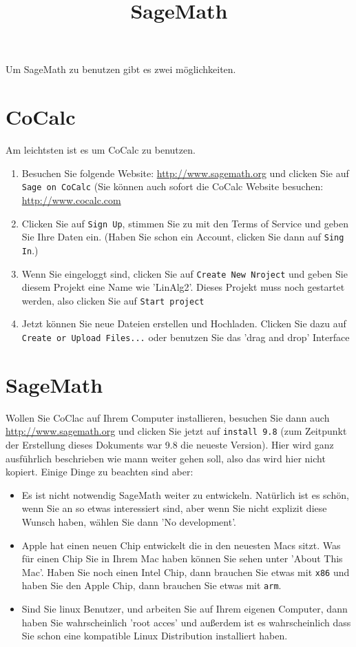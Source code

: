 \documentclass{article}
\title{SageMath}
\theoremstyle{plain}
\theoremstyle{definition}
\theoremstyle{remakr}
\begin{document}
Um SageMath zu benutzen gibt es zwei möglichkeiten.

\section{CoCalc}
Am leichtsten ist es um CoCalc zu benutzen. 
\begin{enumerate}
\item Besuchen Sie folgende Website: \url{http://www.sagemath.org} und clicken Sie auf \verb+Sage on CoCalc+ (Sie können auch sofort die CoCalc Website besuchen: \url{http://www.cocalc.com}
\item Clicken Sie auf \verb+Sign Up+, stimmen Sie zu mit den Terms of Service und geben Sie Ihre Daten ein. (Haben Sie schon ein Account, clicken Sie dann auf \verb+Sing In+.)
\item Wenn Sie eingeloggt sind, clicken Sie auf \verb+Create New Nroject+ und geben Sie diesem Projekt eine Name wie 'LinAlg2'. Dieses Projekt muss noch gestartet werden, also clicken Sie auf \verb+Start project+
\item Jetzt können Sie neue Dateien erstellen und Hochladen. Clicken Sie dazu auf \verb+Create or Upload Files...+ oder benutzen Sie das 'drag and drop' Interface
\end{enumerate}

\section{SageMath}
Wollen Sie CoClac auf Ihrem Computer installieren, besuchen Sie dann auch \url{http://www.sagemath.org} und clicken Sie jetzt auf \verb+install 9.8+ (zum Zeitpunkt der Erstellung dieses Dokuments war 9.8 die neueste Version). Hier wird ganz ausführlich beschrieben wie mann weiter gehen soll, also das wird hier nicht kopiert. Einige Dinge zu beachten sind aber:
\begin{itemize}
\item Es ist nicht notwendig SageMath weiter zu entwickeln. Natürlich ist es schön, wenn Sie an so etwas interessiert sind, aber wenn Sie nicht explizit diese Wunsch haben, wählen Sie dann 'No development'.
\item Apple hat einen neuen Chip entwickelt die in den neuesten Macs sitzt. Was für einen Chip Sie in Ihrem Mac haben können Sie sehen unter 'About This Mac'. Haben Sie noch einen Intel Chip, dann brauchen Sie etwas mit \verb+x86+ und haben Sie den Apple Chip, dann brauchen Sie etwas mit \verb+arm+.
\item Sind Sie linux Benutzer, und arbeiten Sie auf Ihrem eigenen Computer, dann haben Sie wahrscheinlich 'root acces' und außerdem ist es wahrscheinlich dass Sie schon eine kompatible Linux Distribution installiert haben.
\end{itemize}
\end{document}
